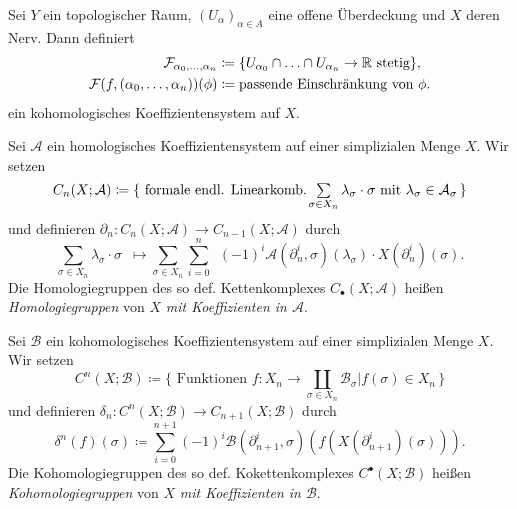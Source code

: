 \documentclass{cheat-sheet}
\newcommand{\nspace}[1]{\foreach \i in {1,...,#1}{ \! }} %
\begin{document}

\begin{bsp}
  Sei $Y$ ein topologischer Raum, $(U_\alpha)_{\alpha \in A}$ eine offene Überdeckung und $X$ deren Nerv. Dann definiert
  \begin{align*}
    \mathcal{F}_{\alpha_0, \ldots, \alpha_n} & \coloneqq \{ U_{\alpha_0} \cap \ldots \cap U_{\alpha_n} \to \mathbb{R} \text{ stetig} \}, \\
    \mathcal{F}(f, (\alpha_0, \ldots, \alpha_n))(\phi) & \coloneqq \text{passende Einschränkung von $\phi$}.
  \end{align*}
  ein kohomologisches Koeffizientensystem auf $X$.
\end{bsp}


\begin{defn}
  Sei $\mathcal{A}$ ein homologisches Koeffizientensystem auf einer simplizialen Menge $X$. Wir setzen
  \[ C_n(X; \mathcal{A}) \coloneqq \{ \text{ formale endl. Linearkomb. } \nspace{3} \sum_{\sigma \in X_n} \lambda_\sigma \cdot \sigma \text{ mit } \lambda_\sigma \in \mathcal{A}_\sigma \, \} \]
  und definieren $\partial_n : C_n(X; \mathcal{A}) \to C_{n-1}(X; \mathcal{A})$ durch
  \[ \sum_{\sigma \in X_n} \lambda_\sigma \cdot \sigma \enspace \mapsto \sum_{\sigma \in X_n} \sum_{i=0}^n \enspace (-1)^i \mathcal{A}(\partial_n^i, \sigma)(\lambda_\sigma) \cdot X(\partial_n^i)(\sigma). \]
  Die Homologiegruppen des so def. Kettenkomplexes $C_\bullet(X; \mathcal{A})$ heißen \emph{Homologiegruppen} von $X$ \emph{mit Koeffizienten in $\mathcal{A}$}.
\end{defn}

\begin{defn}
  Sei $\mathcal{B}$ ein kohomologisches Koeffizientensystem auf einer simplizialen Menge $X$. Wir setzen
  \[ C^n(X; \mathcal{B}) \coloneqq \{ \text{ Funktionen } f : X_n \to \coprod_{\sigma \in X_n} \mathcal{B}_\sigma | f(\sigma) \in X_n \, \} \]
  und definieren $\delta_n : C^n(X; \mathcal{B}) \to C_{n+1}(X; \mathcal{B})$ durch
  \[ \delta^n(f)(\sigma) \coloneqq \sum_{i=0}^{n+1} (-1)^i \mathcal{B}(\partial_{n+1}^i, \sigma)(f(X(\partial_{n+1}^i)(\sigma))). \]
  Die Kohomologiegruppen des so def. Kokettenkomplexes $C^\bullet(X; \mathcal{B})$ heißen \emph{Kohomologiegruppen} von $X$ \emph{mit Koeffizienten in $\mathcal{B}$}.
\end{defn}
\end{document}
